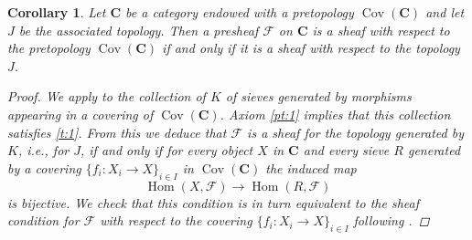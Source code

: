 \documentclass[12pt,reqno,a4paper]{amsart}
\theoremstyle{plain}
\newtheorem{cor}[thm]{Corollary}
\theoremstyle{definition}
\theoremstyle{remark}
\begin{document}
\begin{cor}\label{cor:sheaves}
  Let $\mathbf{C}$ be a category endowed with a pretopology $\operatorname{Cov}(\mathbf{C})$ and let $J$ be the associated topology.
  Then a presheaf $\mathscr{F}$ on $\mathbf{C}$ is a sheaf with respect to the pretopology $\operatorname{Cov}(\mathbf{C})$ if and only if it is a sheaf with respect to the topology $J$.
  \begin{proof}
    We apply  to the collection of $K$ of sieves generated by morphisms appearing in a covering of $\operatorname{Cov}(\mathbf{C})$.
    Axiom \ref{pt:1} implies that this collection satisfies \ref{t:1}.
    From this we deduce that $\mathscr{F}$ is a sheaf for the topology generated by $K$, i.e., for $J$, if and only if for every object $X$ in $\mathbf{C}$ and every sieve $R$ generated by a covering $\{ f_{i} \colon X_{i} \to X\}_{i \in I}$ in $\operatorname{Cov}(\mathbf{C})$ the induced map
    \[ \operatorname{Hom}(X,\mathscr{F}) \to \operatorname{Hom}(R,\mathscr{F}) \]
    is bijective.
    We check that this condition is in turn equivalent to the sheaf condition for $\mathscr{F}$ with respect to the covering $\{ f_{i} \colon X_{i} \to X \}_{i \in I}$ following \cite[\href{https://stacks.math.columbia.edu/tag/00ZC}{Tag 00ZC}]{stacks-project}.


\end{proof}
\end{cor}
\end{document}
